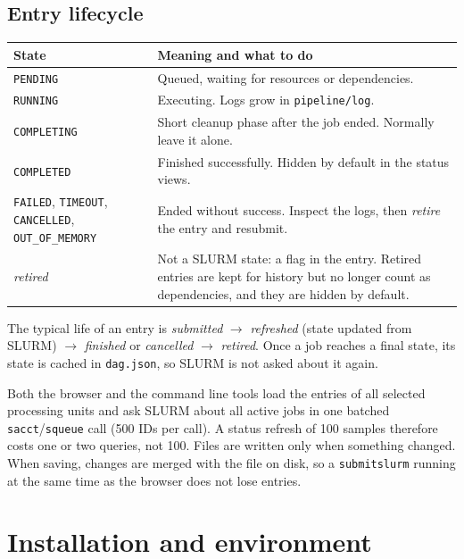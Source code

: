 \documentclass[11pt,a4paper]{article}
\newcommand{\cmd}[1]{\texttt{#1}}
\begin{document}
\subsection{Entry lifecycle}

\begin{center}
\begin{tabularx}{\linewidth}{@{}l>{\raggedright\arraybackslash}X@{}}
\toprule
State & Meaning and what to do \\
\midrule
\cmd{PENDING} & Queued, waiting for resources or dependencies. \\
\cmd{RUNNING} & Executing. Logs grow in \cmd{pipeline/log}. \\
\cmd{COMPLETING} & Short cleanup phase after the job ended. Normally leave it alone. \\
\cmd{COMPLETED} & Finished successfully. Hidden by default in the status views. \\
\cmd{FAILED}, \cmd{TIMEOUT}, \cmd{CANCELLED}, \cmd{OUT\_OF\_MEMORY} & Ended without success. Inspect the logs, then \emph{retire} the entry and resubmit. \\
\textit{retired} & Not a SLURM state: a flag in the entry. Retired entries are kept for history but no longer count as dependencies, and they are hidden by default. \\
\bottomrule
\end{tabularx}
\end{center}

The typical life of an entry is
\emph{submitted} $\rightarrow$ \emph{refreshed} (state updated from SLURM) $\rightarrow$
\emph{finished} or \emph{cancelled} $\rightarrow$ \emph{retired}.
Once a job reaches a final state, its state is cached in \cmd{dag.json}, so SLURM is not asked
about it again.

\begin{note}
Both the browser and the command line tools load the entries of all selected processing units
and ask SLURM about all active jobs in one batched \cmd{sacct}/\cmd{squeue} call (500 IDs per
call). A status refresh of 100 samples therefore costs one or two queries, not 100.
Files are written only when something changed. When saving, changes are merged with the file on
disk, so a \cmd{submitslurm} running at the same time as the browser does not lose entries.
\end{note}

\section{Installation and environment}
\end{document}
